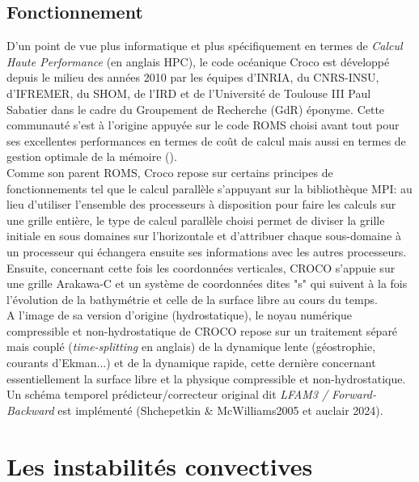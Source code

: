 \documentclass{rapportECC}
\begin{document}
\subsection{Fonctionnement}
D'un point de vue plus informatique et plus spécifiquement en termes de \textit{Calcul Haute Performance} (en anglais HPC), le code océanique Croco est développé depuis le milieu des années 2010 par les équipes d'INRIA, du CNRS-INSU, d'IFREMER, du SHOM, de l'IRD et de l'Université de Toulouse III Paul Sabatier dans le cadre du Groupement de Recherche (GdR) éponyme. Cette communauté s'est à l'origine appuyée sur le code ROMS choisi avant tout pour ses excellentes performances en termes de coût de calcul mais aussi en termes de gestion optimale de la mémoire (\cite{shchepetkin_regional_2005}).\\
Comme son parent ROMS, Croco repose sur certains principes de fonctionnements tel que le calcul parallèle s'appuyant sur la bibliothèque MPI: au lieu d'utiliser l'ensemble des processeurs à disposition pour faire les calculs sur une grille entière, le type de calcul parallèle choisi permet de diviser la grille initiale en sous  domaines sur l'horizontale et d'attribuer chaque sous-domaine à  un processeur qui échangera ensuite ses informations avec les autres processeurs. \\
Ensuite, concernant cette fois les coordonnées verticales, CROCO s'appuie sur une grille Arakawa-C et un système de coordonnées dites "s" qui suivent à la fois l'évolution de la bathymétrie et celle de la surface libre au cours du temps. \\
A l'image de sa version d'origine (hydrostatique), le noyau numérique compressible et non-hydrostatique de CROCO repose sur un traitement séparé mais couplé (\textit{time-splitting} en anglais) de la dynamique lente (géostrophie, courants d'Ekman...) et de la dynamique rapide, cette dernière concernant essentiellement la surface libre et la physique compressible et non-hydrostatique. Un schéma temporel prédicteur/correcteur original dit \textit{LFAM3 / Forward-Backward} est implémenté (Shchepetkin \& McWilliams2005 et auclair 2024).\\




\section{Les instabilités convectives}
\end{document}
